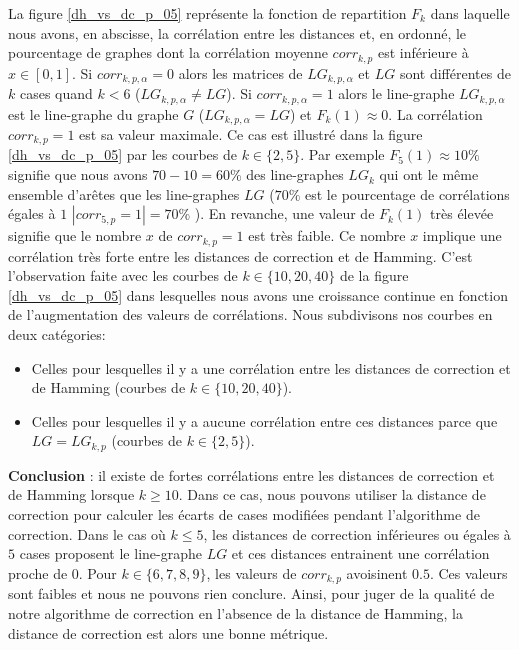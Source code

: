 La figure \ref{dh_vs_dc_p_05} repr\'esente la fonction de repartition $F_k$ dans laquelle nous avons, en abscisse, la corr\'elation entre les distances et, en ordonn\'e, le pourcentage de graphes dont la corr\'elation moyenne $corr_{k,p}$ est inf\'erieure \`a $x \in [0,1]$. 
Si $corr_{k,p,\alpha} = 0$ alors les matrices de $LG_{k,p,\alpha}$ et $LG$ sont diff\'erentes de $k$ cases quand $k < 6$ ($LG_{k,p,\alpha} \neq LG$).
Si $corr_{k,p,\alpha} = 1$ alors le line-graphe $LG_{k, p, \alpha}$ est le line-graphe du graphe $G$ ($LG_{k, p, \alpha} = LG$) et $F_k(1) \approx 0$. 
La corr\'elation $corr_{k,p} = 1$ est sa valeur maximale. 
Ce cas est illustr\'e dans la figure \ref{dh_vs_dc_p_05} par les courbes de $k \in \{2,5\}$. 
Par exemple $F_5(1) \approx 10\%$ signifie que nous avons $70-10=60\%$ des line-graphes $LG_k$ qui ont le m\^eme ensemble d'ar\^etes que les line-graphes $LG$ ($70\%$ est le pourcentage de corr\'elations \'egales \`a $1$ $|corr_{5,p} = 1 | = 70\%$ ).
\newline
En revanche, une valeur de $F_k(1)$ tr\`es \'elev\'ee signifie que le nombre $x$ de  $corr_{k,p} = 1$ est tr\`es faible. Ce nombre $x$ implique une corr\'elation tr\`es forte entre les distances de correction et de Hamming.
C'est l'observation faite avec les courbes de $k \in \{10,20,40\}$ de la figure \ref{dh_vs_dc_p_05} dans lesquelles nous avons une  croissance continue en fonction de l'augmentation des valeurs de corr\'elations.
\newline
Nous subdivisons nos courbes en deux cat\'egories:
\begin{itemize}
	\item Celles pour lesquelles il y a une corr\'elation entre les distances de correction et de Hamming (courbes de $k \in \{10,20,40\}$).
	\item Celles pour lesquelles il y a  aucune corr\'elation entre ces distances parce que   $LG = LG_{k,p}$ (courbes de $k \in \{2,5\}$). 
\end{itemize}


{\bf Conclusion} :
il existe de fortes corr\'elations entre les distances de correction et de Hamming lorsque $k \ge 10$. Dans ce cas, nous pouvons utiliser la distance de correction pour calculer les \'ecarts de cases modifi\'ees pendant l'algorithme de correction.
Dans le cas o\`u $k \le 5$, les distances de correction inf\'erieures ou \'egales \`a $5$ cases proposent le line-graphe $LG$ et ces distances entrainent une corr\'elation proche de $0$.
Pour  $k \in \{6,7,8,9\}$, les valeurs de $corr_{k,p}$ avoisinent $0.5$. Ces valeurs sont faibles et nous ne pouvons rien conclure.
Ainsi, pour juger de la qualit\'e de notre algorithme de correction en l'absence de la distance de Hamming, la distance de correction est alors une bonne m\'etrique.
